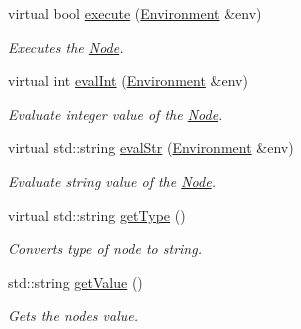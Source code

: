 \begin{DoxyCompactItemize}
virtual bool \hyperlink{classNode_ad2758f63dc60560b83e1d8a038df6e86}{execute} (\hyperlink{classEnvironment}{Environment} \&env)
\begin{DoxyCompactList}\small\item\em Executes the \hyperlink{classNode}{Node}. \end{DoxyCompactList}\item 
virtual int \hyperlink{classNode_ab5a9a064d1d0ef20c984b1d76e56d843}{eval\+Int} (\hyperlink{classEnvironment}{Environment} \&env)
\begin{DoxyCompactList}\small\item\em Evaluate integer value of the \hyperlink{classNode}{Node}. \end{DoxyCompactList}\item 
virtual std\+::string \hyperlink{classNode_a8ee89abe1c903f5a0bae8ed3c798b47a}{eval\+Str} (\hyperlink{classEnvironment}{Environment} \&env)
\begin{DoxyCompactList}\small\item\em Evaluate string value of the \hyperlink{classNode}{Node}. \end{DoxyCompactList}\item 
virtual std\+::string \hyperlink{classNode_abce0a9ddac6a5e2c0e546dbe6af02e3d}{get\+Type} ()
\begin{DoxyCompactList}\small\item\em Converts type of node to string. \end{DoxyCompactList}\item 
std\+::string \hyperlink{classNode_afaf17dbadc6bca669dbbe97bf252c88e}{get\+Value} ()
\begin{DoxyCompactList}\small\item\em Gets the nodes value. \end{DoxyCompactList}\end{DoxyCompactItemize}

